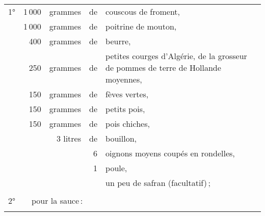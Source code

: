 \footnotesize
\begin{tabular}{@{}lrrrp{16em}}
\normalsize1°\footnotesize \hspace{2em} & 1 000 & grammes  & de & couscous de froment,                    \\
\hspace{2em} & 1 000 & grammes  & de & poitrine de mouton,                                                \\
\hspace{2em} &   400 & grammes  & de & beurre,                                                            \\
\hspace{2em} &   250 & grammes  & de & petites courges d'Algérie, de la grosseur de pommes
                                       de terre de Hollande moyennes,                                     \\
\hspace{2em} &   150 & grammes  & de & fèves vertes,                                                      \\
\hspace{2em} &   150 & grammes  & de & petits pois,                                                       \\
\hspace{2em} &   150 & grammes  & de & pois chiches,                                                      \\
\hspace{2em} &       & 3 litres & de & bouillon,                                                          \\
\hspace{2em} &       &          &  6 & oignons moyens coupés en rondelles,                                \\
\hspace{2em} &       &          &  1 & poule,                                                             \\
\hspace{2em} &       &          &    & un peu de safran (facultatif) ;                                    \\
\hspace{2em} &       &          &    &                                                                    \\
\normalsize 2° & \multicolumn{4}{l}{\normalsize   pour la sauce :}                                        \\
\footnotesize

\end{tabular}
